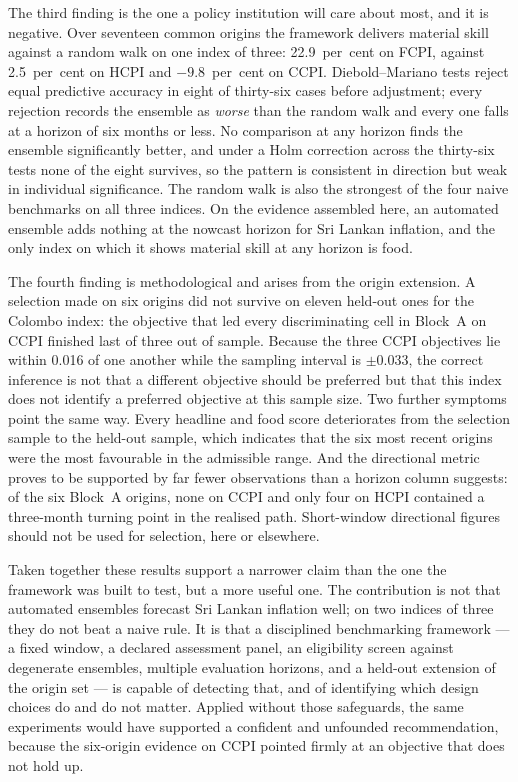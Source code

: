 \documentclass[12pt]{article}
\begin{document}
The third finding is the one a policy institution will care about most, and it
is negative. Over seventeen common origins the framework delivers material
skill against a random walk on one index of three: 22.9~per~cent on FCPI,
against 2.5~per~cent on HCPI and $-9.8$~per~cent on CCPI. Diebold--Mariano
tests reject equal predictive accuracy in eight of thirty-six cases before
adjustment; every rejection records the ensemble as \emph{worse} than the
random walk and every one falls at a horizon of six months or less. No
comparison at any horizon finds the ensemble significantly better, and under a
Holm correction across the thirty-six tests none of the eight survives, so the
pattern is consistent in direction but weak in individual significance. The
random walk is also the strongest of the four naive benchmarks on all three
indices. On the evidence assembled here, an automated ensemble adds nothing at
the nowcast horizon for Sri Lankan inflation, and the only index on which it
shows material skill at any horizon is food.

The fourth finding is methodological and arises from the origin extension. A
selection made on six origins did not survive on eleven held-out ones for the
Colombo index: the objective that led every discriminating cell in Block~A on CCPI
finished last of three out of sample. Because the three CCPI objectives lie
within 0.016 of one another while the sampling interval is $\pm 0.033$, the
correct inference is not that a different objective should be preferred but
that this index does not identify a preferred objective at this sample size.
Two further symptoms point the same way. Every headline and food score
deteriorates from the selection sample to the held-out sample, which indicates
that the six most recent origins were the most favourable in the admissible
range. And the directional metric proves
to be supported by far fewer observations than a horizon column suggests: of
the six Block~A origins, none on CCPI and only four on HCPI contained a
three-month turning point in the realised path. Short-window directional
figures should not be used for selection, here or elsewhere.

Taken together these results support a narrower claim than the one the
framework was built to test, but a more useful one. The contribution is not
that automated ensembles forecast Sri Lankan inflation well; on two indices of
three they do not beat a naive rule. It is that a disciplined benchmarking
framework --- a fixed window, a declared assessment panel, an eligibility
screen against degenerate ensembles, multiple evaluation horizons, and a
held-out extension of the origin set --- is capable of detecting that, and of
identifying which design choices do and do not matter. Applied without those
safeguards, the same experiments would have supported a confident and
unfounded recommendation, because the six-origin evidence on CCPI pointed
firmly at an objective that does not hold up.
\end{document}
